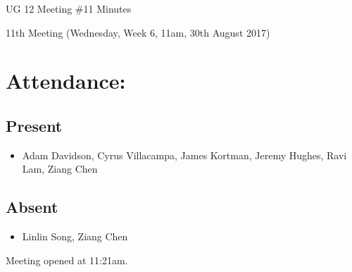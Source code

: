 \documentclass{article}
\begin{document}
\begin{adjustwidth}{2.5em}{0pt}
\begin{center}
\Large{UG 12 Meeting \#11 Minutes}\\
\end{center}
\end{adjustwidth}


11th Meeting (Wednesday, Week 6, 11am, 30th August 2017)
\section{Attendance:}
\subsection*{Present}
\begin{itemize}
\item Adam Davidson, Cyrus Villacampa, James Kortman, Jeremy Hughes, Ravi Lam, Ziang Chen
\end{itemize}
\subsection*{Absent}
\begin{itemize}
\item Linlin Song, Ziang Chen
\end {itemize}

Meeting opened at 11:21am.
\end{document}
